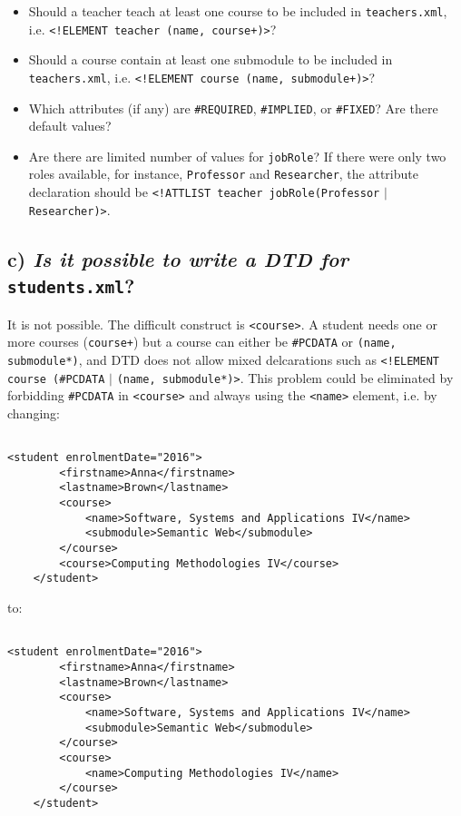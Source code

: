 \documentclass[11pt]{article} %
\begin{document}
\begin{itemize}

\item{Should a teacher teach at least one course to be included in \verb|teachers.xml|, i.e. \verb|<!ELEMENT teacher (name, course+)>|?}
\item{Should a course contain at least one submodule to be included in \verb|teachers.xml|, i.e. \verb|<!ELEMENT course (name, submodule+)>|?}
\item{Which attributes (if any) are \verb|#REQUIRED|, \verb|#IMPLIED|, or \verb|#FIXED|? Are there default values?}
\item{Are there are limited number of values for \verb|jobRole|? If there were only two roles available, for instance, \verb|Professor| and \verb|Researcher|, the attribute declaration should be \verb|<!ATTLIST teacher jobRole(Professor| $|$ \verb|Researcher)>|.}

\end{itemize}

\subsection*{c) \textit{Is it possible to write a DTD for} \texttt{students.xml}?}

It is not possible. The difficult construct is \verb|<course>|. A student needs one or more courses (\verb|course+|) but a course can either be \verb|#PCDATA| or \verb|(name, submodule*)|, and DTD does not allow mixed delcarations such as \verb|<!ELEMENT course (#PCDATA| $|$ \verb|(name, submodule*)>|. This problem could be eliminated by forbidding \verb|#PCDATA| in \verb|<course>| and always using the \verb|<name>| element, i.e. by changing:

\begin{verbatim}

<student enrolmentDate="2016">
        <firstname>Anna</firstname>
        <lastname>Brown</lastname>
        <course>
            <name>Software, Systems and Applications IV</name>
            <submodule>Semantic Web</submodule>
        </course>
        <course>Computing Methodologies IV</course>
    </student>

\end{verbatim}

to:

\begin{verbatim}

<student enrolmentDate="2016">
        <firstname>Anna</firstname>
        <lastname>Brown</lastname>
        <course>
            <name>Software, Systems and Applications IV</name>
            <submodule>Semantic Web</submodule>
        </course>
        <course>
            <name>Computing Methodologies IV</name>
        </course>
    </student>

\end{verbatim}
\end{document}
